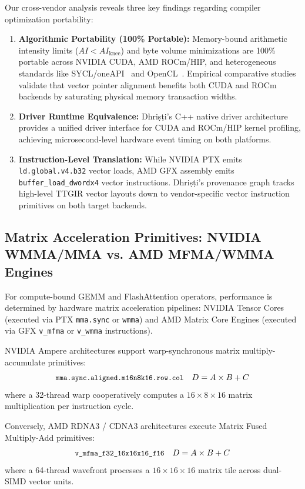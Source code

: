 \documentclass[10pt,journal,compsoc]{IEEEtran}
\begin{document}
Our cross-vendor analysis reveals three key findings regarding compiler optimization portability:
\begin{enumerate}
    \item \textbf{Algorithmic Portability (100\% Portable):} Memory-bound arithmetic intensity limits ($AI < AI_{\text{knee}}$) and byte volume minimizations are 100\% portable across NVIDIA CUDA, AMD ROCm/HIP, and heterogeneous standards like SYCL/oneAPI~\cite{reinders2021sycl} and OpenCL~\cite{stone2010opencl}. Empirical comparative studies~\cite{berneti2022rocm} validate that vector pointer alignment benefits both CUDA and ROCm backends by saturating physical memory transaction widths.
    \item \textbf{Driver Runtime Equivalence:} Dhri\d{s}\d{t}i's C++ native driver architecture provides a unified driver interface for CUDA and ROCm/HIP kernel profiling, achieving microsecond-level hardware event timing on both platforms.
    \item \textbf{Instruction-Level Translation:} While NVIDIA PTX emits \texttt{ld.global.v4.b32} vector loads, AMD GFX assembly emits \texttt{buffer\_load\_dwordx4} vector instructions. Dhri\d{s}\d{t}i's provenance graph tracks high-level TTGIR vector layouts down to vendor-specific vector instruction primitives on both target backends.
\end{enumerate}

\subsection{Matrix Acceleration Primitives: NVIDIA WMMA/MMA vs. AMD MFMA/WMMA Engines}
For compute-bound GEMM and FlashAttention operators, performance is determined by hardware matrix acceleration pipelines: NVIDIA Tensor Cores (executed via PTX \texttt{mma.sync} or \texttt{wmma}) and AMD Matrix Core Engines (executed via GFX \texttt{v\_mfma} or \texttt{v\_wmma} instructions).

NVIDIA Ampere architectures support warp-synchronous matrix multiply-accumulate primitives:
\begin{equation}
\text{\small\texttt{mma.sync.aligned.m16n8k16.row.col}} \quad D = A \times B + C
\end{equation}
where a 32-thread warp cooperatively computes a $16 \times 8 \times 16$ matrix multiplication per instruction cycle.

Conversely, AMD RDNA3 / CDNA3 architectures execute Matrix Fused Multiply-Add primitives:
\begin{equation}
\text{\small\texttt{v\_mfma\_f32\_16x16x16\_f16}} \quad D = A \times B + C
\end{equation}
where a 64-thread wavefront processes a $16 \times 16 \times 16$ matrix tile across dual-SIMD vector units.
\end{document}
